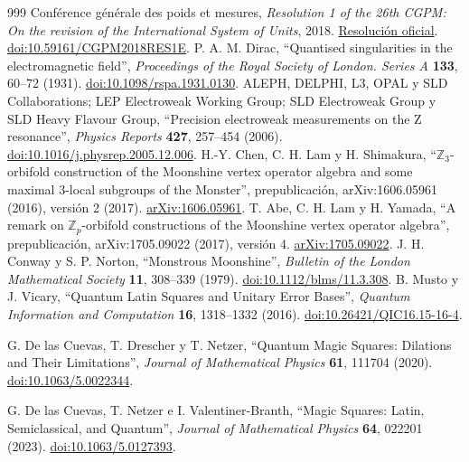 \begin{thebibliography}{999}
 Conférence générale des poids et mesures, \emph{Resolution 1 of the 26th CGPM: On the revision of the International System of Units}, 2018. \href{https://www.bipm.org/en/committees/cg/cgpm/26-2018/resolution-1}{Resolución oficial}. \href{https://doi.org/10.59161/CGPM2018RES1E}{doi:10.59161/CGPM2018RES1E}.
 P. A. M. Dirac, ``Quantised singularities in the electromagnetic field'', \emph{Proceedings of the Royal Society of London. Series A} \textbf{133}, 60--72 (1931). \href{https://doi.org/10.1098/rspa.1931.0130}{doi:10.1098/rspa.1931.0130}.
 ALEPH, DELPHI, L3, OPAL y SLD Collaborations; LEP Electroweak Working Group; SLD Electroweak Group y SLD Heavy Flavour Group, ``Precision electroweak measurements on the Z resonance'', \emph{Physics Reports} \textbf{427}, 257--454 (2006). \href{https://doi.org/10.1016/j.physrep.2005.12.006}{doi:10.1016/j.physrep.2005.12.006}.
 H.-Y. Chen, C. H. Lam y H. Shimakura, ``\(\mathbb Z_3\)-orbifold construction of the Moonshine vertex operator algebra and some maximal \(3\)-local subgroups of the Monster'', prepublicación, arXiv:1606.05961 (2016), versión 2 (2017). \href{https://arxiv.org/abs/1606.05961}{arXiv:1606.05961}.
 T. Abe, C. H. Lam y H. Yamada, ``A remark on \(\mathbb Z_p\)-orbifold constructions of the Moonshine vertex operator algebra'', prepublicación, arXiv:1705.09022 (2017), versión 4. \href{https://arxiv.org/abs/1705.09022v4}{arXiv:1705.09022}.
 J. H. Conway y S. P. Norton, ``Monstrous Moonshine'', \emph{Bulletin of the London Mathematical Society} \textbf{11}, 308--339 (1979). \href{https://doi.org/10.1112/blms/11.3.308}{doi:10.1112/blms/11.3.308}.
 B. Musto y J. Vicary, ``Quantum Latin Squares and Unitary Error Bases'', \emph{Quantum Information and Computation} \textbf{16}, 1318--1332 (2016). \href{https://doi.org/10.26421/QIC16.15-16-4}{doi:10.26421/QIC16.15-16-4}.

 G. De las Cuevas, T. Drescher y T. Netzer, ``Quantum Magic Squares: Dilations and Their Limitations'', \emph{Journal of Mathematical Physics} \textbf{61}, 111704 (2020). \href{https://doi.org/10.1063/5.0022344}{doi:10.1063/5.0022344}.

 G. De las Cuevas, T. Netzer e I. Valentiner-Branth, ``Magic Squares: Latin, Semiclassical, and Quantum'', \emph{Journal of Mathematical Physics} \textbf{64}, 022201 (2023). \href{https://doi.org/10.1063/5.0127393}{doi:10.1063/5.0127393}.


\end{thebibliography}
